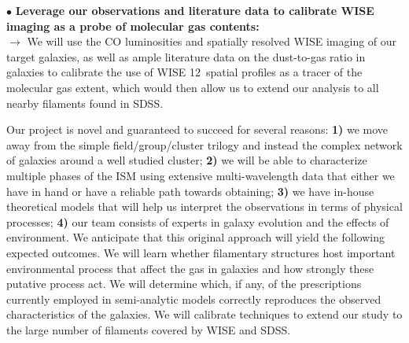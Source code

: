 \documentclass[11pt, preprint]{aastex}
\begin{document}
\noindent $\bullet$ \textbf{Leverage our observations and literature data to calibrate WISE imaging as a probe of molecular gas contents:}\\ $\rightarrow$ We will use the CO luminosities and spatially resolved WISE imaging of our target galaxies, as well as ample literature data on the dust-to-gas ratio in galaxies to calibrate the use of WISE 12\micron\ spatial profiles as a tracer of the molecular gas extent, which would then allow us to extend our analysis to all nearby filaments found in SDSS.

Our project is novel and guaranteed to succeed for several reasons:  \textbf{1)} we move away from the
simple field/group/cluster trilogy and instead the complex network of galaxies around a well studied cluster; \textbf{2)} we will be able to characterize multiple phases of the ISM using extensive multi-wavelength data that either we have in hand or have a reliable path towards obtaining; \textbf{3)} we have in-house theoretical models that will help us interpret the observations in terms of physical processes; \textbf{4)} our team consists of experts in galaxy evolution and the effects of environment.  We anticipate that this original approach will yield the following expected outcomes.  We will learn whether filamentary structures host important environmental process that affect the gas in galaxies and how strongly these putative process act.  We will determine which, if any, of the prescriptions currently employed in semi-analytic models correctly reproduces the observed characteristics of the galaxies.  We will calibrate techniques to extend our study to the large number of filaments covered by WISE and SDSS.


\end{document}
